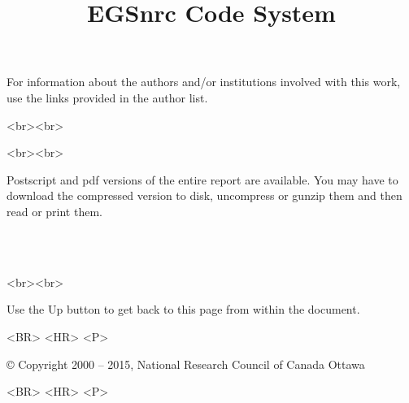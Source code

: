 \documentclass[12pt,twoside]{article}  %
\begin{document}
\begin{htmlonly}
For information about the authors and/or institutions involved with this
work, use the links provided in the author list.\\
\begin{rawhtml}
<br><br>
\end{rawhtml}


\begin{rawhtml}
<br><br>
\end{rawhtml}

Postscript and pdf versions of the entire report are available.  You may have to
download the compressed version to disk, uncompress or gunzip them and
then read or print them.\\
\begin{center}
\\
\\
\end{center}
\begin{rawhtml}
<br><br>
\end{rawhtml}

Use the Up button to get back to this page from within the document.
\begin{rawhtml}
<BR> <HR> <P>
\end{rawhtml}
\copyright
Copyright 2000 -- 2015, National Research Council of Canada
Ottawa
\begin{rawhtml}
<BR> <HR> <P>
\end{rawhtml}
\end{htmlonly}

\pagestyle{empty}



\title{EGSnrc Code System}
\end{document}

